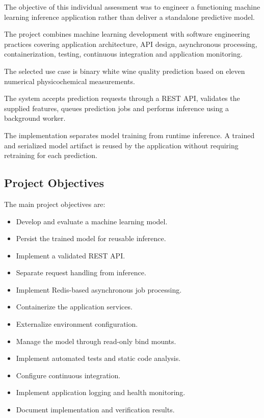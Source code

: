 \documentclass[11pt,a4paper]{article}
\begin{document}
The objective of this individual assessment was to engineer
a functioning machine learning inference application rather
than deliver a standalone predictive model.

The project combines machine learning development with
software engineering practices covering application
architecture, API design, asynchronous processing,
containerization, testing, continuous integration and
application monitoring.

The selected use case is binary white wine quality
prediction based on eleven numerical physicochemical
measurements.

The system accepts prediction requests through a REST API,
validates the supplied features, queues prediction jobs
and performs inference using a background worker.

The implementation separates model training from runtime
inference. A trained and serialized model artifact is
reused by the application without requiring retraining
for each prediction.

\subsection{Project Objectives}

The main project objectives are:

\begin{itemize}
    \item Develop and evaluate a machine learning model.
    \item Persist the trained model for reusable inference.
    \item Implement a validated REST API.
    \item Separate request handling from inference.
    \item Implement Redis-based asynchronous job processing.
    \item Containerize the application services.
    \item Externalize environment configuration.
    \item Manage the model through read-only bind mounts.
    \item Implement automated tests and static code analysis.
    \item Configure continuous integration.
    \item Implement application logging and health monitoring.
    \item Document implementation and verification results.
\end{itemize}
\end{document}
